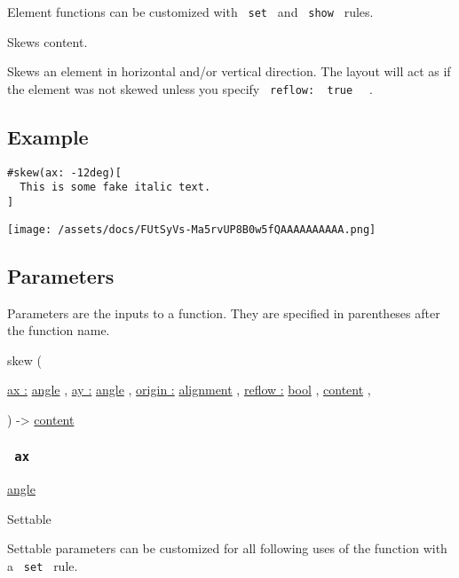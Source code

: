 \label{element-tooltip}
Element functions can be customized with \texttt{\ set\ } and
\texttt{\ show\ } rules.

Skews content.

Skews an element in horizontal and/or vertical direction. The layout
will act as if the element was not skewed unless you specify
\texttt{\ reflow:\ }{\texttt{\ true\ }}\texttt{\ } .

\subsection{Example}\label{example}

\begin{verbatim}
#skew(ax: -12deg)[
  This is some fake italic text.
]
\end{verbatim}

\texttt{[image: /assets/docs/FUtSyVs-Ma5rvUP8B0w5fQAAAAAAAAAA.png]}

\subsection{\texorpdfstring{{ Parameters
}}{ Parameters }}\label{parameters}

\label{parameters-tooltip}
Parameters are the inputs to a function. They are specified in
parentheses after the function name.

{ skew } (

{ \hyperref[parameters-ax]{ax :}
\href{/docs/reference/layout/angle/}{angle} , } {
\hyperref[parameters-ay]{ay :}
\href{/docs/reference/layout/angle/}{angle} , } {
\hyperref[parameters-origin]{origin :}
\href{/docs/reference/layout/alignment/}{alignment} , } {
\hyperref[parameters-reflow]{reflow :}
\href{/docs/reference/foundations/bool/}{bool} , } {
\href{/docs/reference/foundations/content/}{content} , }

) -\textgreater{} \href{/docs/reference/foundations/content/}{content}

\subsubsection{\texorpdfstring{\texttt{\ ax\ }}{ ax }}\label{parameters-ax}

\href{/docs/reference/layout/angle/}{angle}

{{ Settable }}

\label{parameters-ax-settable-tooltip}
Settable parameters can be customized for all following uses of the
function with a \texttt{\ set\ } rule.

